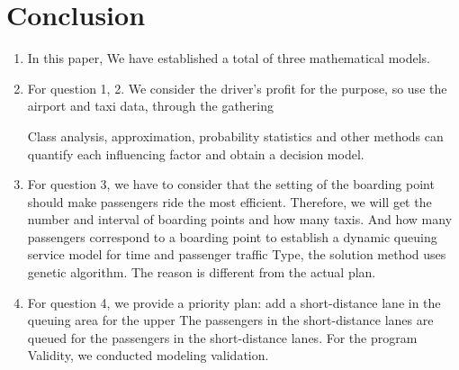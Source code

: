 \section{Conclusion}

\begin{enumerate}
\item In this paper, We have established a total of three mathematical models.
\item For question 1, 2. We consider the driver's profit for the purpose, so use the airport and taxi data, through the gathering

    

Class analysis, approximation, probability statistics and other methods can quantify each influencing factor and obtain a decision model.
\item For question 3, we have to consider that the setting of the boarding point should make passengers ride the most efficient. Therefore, we will get the number and interval of boarding points and how many taxis.
And how many passengers correspond to a boarding point to establish a dynamic queuing service model for time and passenger traffic
Type, the solution method uses genetic algorithm. 
The reason is different from the actual plan.
\item For question 4, we provide a priority plan: add a short-distance lane in the queuing area for the upper
The passengers in the short-distance lanes are queued for the passengers in the short-distance lanes. For the program
Validity, we conducted modeling validation.

\end{enumerate}
